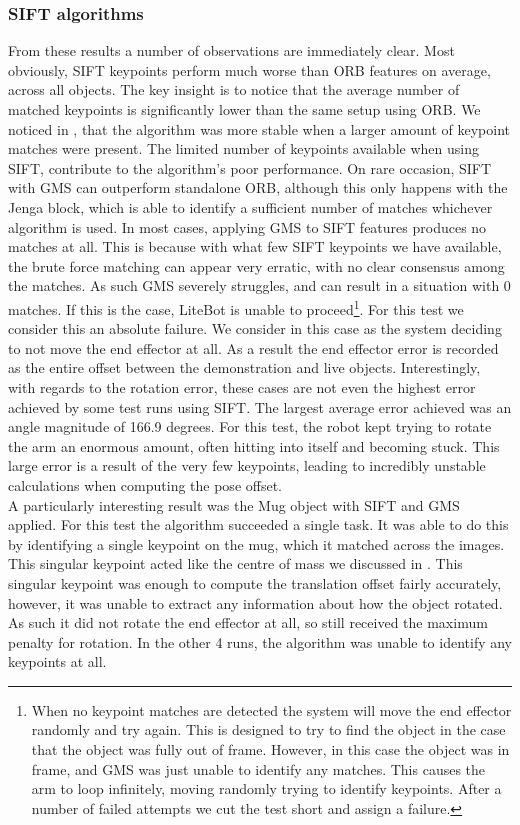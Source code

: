 \subsubsection{SIFT algorithms}
From these results a number of observations are immediately clear. Most obviously, SIFT keypoints perform much worse than ORB features on average, across all objects. The key insight is to notice that the average number of matched keypoints is significantly lower than the same setup using ORB. We noticed in , that the algorithm was more stable when a larger amount of keypoint matches were present. The limited number of keypoints available when using SIFT, contribute to the algorithm's poor performance. On rare occasion, SIFT with GMS can outperform standalone ORB, although this only happens with the Jenga block, which is able to identify a sufficient number of matches whichever algorithm is used. In most cases, applying GMS to SIFT features produces no matches at all. This is because with what few SIFT keypoints we have available, the brute force matching can appear very erratic, with no clear consensus among the matches. As such GMS severely struggles, and can result in a situation with 0 matches. If this is the case, LiteBot is unable to proceed\footnote{When no keypoint matches are detected the system will move the end effector randomly and try again. This is designed to try to find the object in the case that the object was fully out of frame. However, in this case the object was in frame, and GMS was just unable to identify any matches. This causes the arm to loop infinitely, moving randomly trying to identify keypoints. After a number of failed attempts we cut the test short and assign a failure.}. For this test we consider this an absolute failure. We consider in this case as the system deciding to not move the end effector at all. As a result the end effector error is recorded as the entire offset between the demonstration and live objects. Interestingly, with regards to the rotation error, these cases are not even the highest error achieved by some test runs using SIFT. The largest average error achieved was an angle magnitude of 166.9 degrees. For this test, the robot kept trying to rotate the arm an enormous amount, often hitting into itself and becoming stuck. This large error is a result of the very few keypoints, leading to incredibly unstable calculations when computing the pose offset.\\

A particularly interesting result was the Mug object with SIFT and GMS applied. For this test the algorithm succeeded a single task. It was able to do this by identifying a single keypoint on the mug, which it matched across the images. This singular keypoint acted like the centre of mass we discussed in . This singular keypoint was enough to compute the translation offset fairly accurately, however, it was unable to extract any information about how the object rotated. As such it did not rotate the end effector at all, so still received the maximum penalty for rotation. In the other 4 runs, the algorithm was unable to identify any keypoints at all.\\

